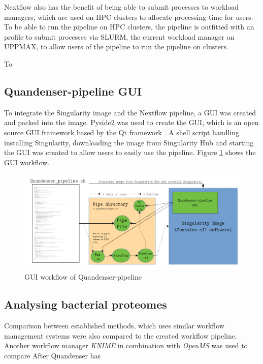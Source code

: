 Nextflow also has the benefit of being able to submit processes to workload managers, which are used on HPC clusters to allocate processing time for users. To be able to run the pipeline on HPC clusters, the pipeline is outfitted with an profile to submit processes via SLURM, the current workload manager on UPPMAX, to allow users of the pipeline to run the pipeline on clusters.

To

\subsection{Quandenser-pipeline GUI}
To integrate the Singularity image and the Nextflow pipeline, a GUI was created and packed into the image. Pyside2 was used to create the GUI, which is an open source GUI framework based by the Qt framework \cite{pyside2}. A shell script handling installing Singularity, downloading the image from Singularity Hub and starting the GUI was created to allow users to easily use the pipeline. Figure \ref{fig:GUI_workflow} shows the GUI workflow.

\begin{figure}[!htbp]
  \includegraphics[width=\linewidth]{pictures/GUI_workflow.png}
  \caption{GUI workflow of Quandenser-pipeline}
  \label{fig:GUI_workflow}
\end{figure}

\subsection{Analysing bacterial proteomes}
Comparison between established methods, which uses similar workflow management systems were also compared to the created workflow pipeline. Another workflow manager \textit{KNIME} in combination with \textit{OpenMS} was used to compare
After Quandenser has
